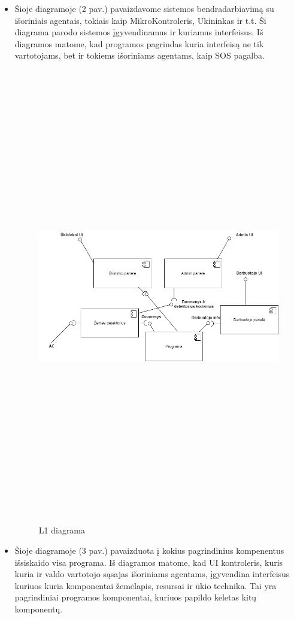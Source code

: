 \documentclass[oneside]{VUMIFPSkursinis}
\begin{document}
	\begin{itemize}
	\item Šioje diagramoje (2 pav.) pavaizdavome sistemos bendradarbiavimą su išoriniais agentais, tokiais kaip MikroKontroleris, Ukininkas ir t.t. Ši diagrama parodo sistemos įgyvendinamus ir kuriamus interfeisus. Iš diagramos matome, kad programos pagrindas kuria interfeisą ne tik vartotojams, bet ir tokiems išoriniams agentams, kaip SOS pagalba.
	\begin{figure}[H]
		\centering	
	\includegraphics[width=17cm,height=20cm,keepaspectratio]{L1.png}
	\caption{L1 diagrama}
	\label{fig:L1}
\end{figure}
\item Šioje diagramoje (3 pav.) pavaizduota į kokius pagrindinius kompenentus išsiskaido visa programa. Iš diagramos matome, kad UI kontroleris, kuris kuria ir valdo vartotojo sąsajas išoriniams agentams, įgyvendina interfeisus kuriuos kuria komponentai žemėlapis, resursai ir ūkio technika. Tai yra pagrindiniai programos komponentai, kuriuos papildo keletas kitų komponentų.

\end{itemize}
\pagebreak
\end{document}
